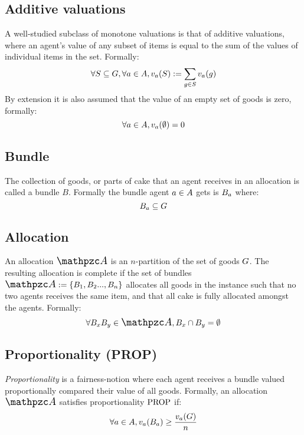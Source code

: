 \subsection*{Additive valuations}
A well-studied subclass of monotone valuations is that of additive valuations, where an agent's value of any subset of items is equal to the sum of the values of individual items in the set. 
Formally: 
$$\forall S \subseteq G,\forall a\in A, v_a(S):=\sum_{g\in S}v_a(g)$$
By extension it is also assumed that the value of an empty set of goods is zero, formally:
$$\forall a\in A, v_a(\emptyset)=0$$



\subsection*{Bundle}
The collection of goods, or parts of cake that an agent receives in an allocation is called a bundle $B$. Formally the bundle agent $a\in A$ gets is $B_a$ where:
$$B_a\subseteq G$$



\subsection*{Allocation}
An allocation $\sAllocation$ is an $n$-partition of the set of goods $G$. The resulting allocation is complete if the set of bundles $\sAllocation := \{\sBundle_1,\sBundle_2...,\sBundle_\sNumAgents\}$ allocates all goods in the instance such that no two agents receives the same item, and that all cake is fully allocated amongst the agents. Formally:
$$\forall\sBundle_x\sBundle_y\in\sAllocation, \sBundle_x\cap\sBundle_y=\emptyset$$




\subsection*{Proportionality (PROP)}
\emph{Proportionality} is a fairness-notion where each agent receives a bundle valued proportionally compared their value of all goods. Formally, an allocation $\sAllocation$ satisfies proportionality $\text{PROP}$ if:
$$\forall a\in A, v_a(B_a)\geq\frac{v_a(G)}{n}$$



